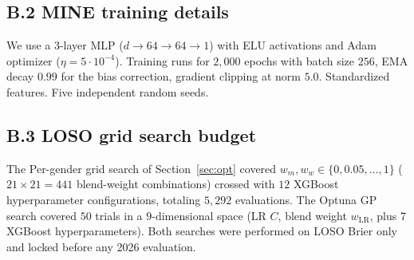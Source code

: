 \documentclass[11pt,a4paper]{article}
\theoremstyle{definition}
\begin{document}
\subsection*{B.2 MINE training details}

We use a 3-layer MLP ($d \to 64 \to 64 \to 1$) with ELU activations and Adam optimizer ($\eta = 5 \cdot 10^{-4}$). Training runs for $2{,}000$ epochs with batch size $256$, EMA decay $0.99$ for the bias correction, gradient clipping at norm $5.0$. Standardized features. Five independent random seeds.

\subsection*{B.3 LOSO grid search budget}

The Per-gender grid search of Section~\ref{sec:opt} covered $w_m, w_w \in \{0, 0.05, \dots, 1\}$ ($21 \times 21 = 441$ blend-weight combinations) crossed with $12$ XGBoost hyperparameter configurations, totaling $5{,}292$ evaluations. The Optuna GP search covered $50$ trials in a $9$-dimensional space (LR $C$, blend weight $w_{\mathrm{LR}}$, plus 7 XGBoost hyperparameters). Both searches were performed on LOSO Brier only and locked before any 2026 evaluation.

\end{document}

